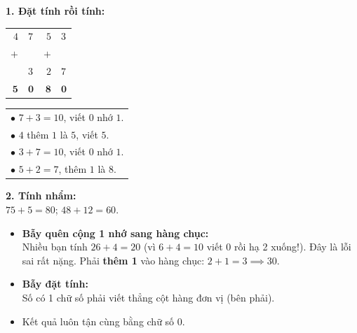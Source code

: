 \documentclass[11pt,a4paper]{article}
\begin{document}
\vspace{-1.5mm}
\noindent
\begin{minipage}[t]{0.49\textwidth}\vspace{0pt}
\begin{tcolorbox}[
  enhanced,
  colback=green!4!white,
  colframe=green!60!black,
  arc=2mm, boxrule=0.8pt,
  left=2mm, right=2mm, top=1.8mm, bottom=1.8mm,
  title={\footnotesize\bfseries\color{white}\faCheckCircle\ 4. Ví dụ thực hành chuẩn mực}
]
{\footnotesize
\textbf{1. Đặt tính rồi tính:}\\
\begin{tabular}{r@{\,}lr@{\,}l}
  $4$ & $7$ & $5$ & $3$ \\
$+$ & & $+$ & \\
    & $3$ & $2$ & $7$ \\ \hline
  $\mathbf{5}$ & $\mathbf{0}$ & $\mathbf{8}$ & $\mathbf{0}$
\end{tabular}
\quad
\begin{tabular}{l}
  $\bullet$ $7+3=10$, viết $0$ nhớ $1$.\\
  $\bullet$ $4$ thêm $1$ là $5$, viết $5$.\\
  $\bullet$ $3+7=10$, viết $0$ nhớ $1$.\\
  $\bullet$ $5+2=7$, thêm $1$ là $8$.
\end{tabular}
\textbf{2. Tính nhẩm:}\\
$75 + 5 = 80$; $48 + 12 = 60$.
}
\end{tcolorbox}
\end{minipage}
\hfill
\begin{minipage}[t]{0.49\textwidth}\vspace{0pt}
\begin{tcolorbox}[
  enhanced,
  colback=red!4!white,
  colframe=red!75!black,
  arc=2mm, boxrule=0.8pt,
  left=2mm, right=2mm, top=1.8mm, bottom=1.8mm,
  title={\footnotesize\bfseries\color{white}\faExclamationTriangle\ 5. Mẹo tránh bẫy trắc nghiệm}
]
{\footnotesize
\begin{itemize}\setlength{\itemsep}{1pt}\setlength{\leftskip}{-2.5mm}
  \item \textbf{Bẫy quên cộng 1 nhớ sang hàng chục:}\\
  Nhiều bạn tính $26 + 4 = 20$ (vì $6+4=10$ viết 0 rồi hạ 2 xuống!). Đây là lỗi sai rất nặng. Phải \textbf{thêm 1} vào hàng chục: $2 + 1 = 3 \implies 30$.
  \item \textbf{Bẫy đặt tính:}\\
  Số có 1 chữ số phải viết thẳng cột hàng đơn vị (bên phải).
  \item Kết quả luôn tận cùng bằng chữ số $0$.
\end{itemize}
}
\end{tcolorbox}
\end{minipage}
\end{document}
